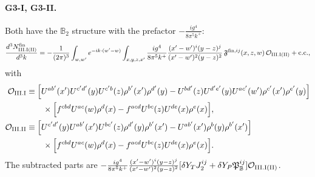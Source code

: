 \documentclass[aps,prd,onecolumn,superscriptaddress,nofootinbib,floatfix,longbibliography,11pt]{revtex4-2}
\numberwithin{equation}{section}
\def\mf#1{\mathbb{#1}}
\newcommand{\pre}{\frac{1}{(2\pi)^3}\int_{w,w'}e^{-ik\cdot(w'-w)}}
\newcommand{\Ord}{\mathcal{O}}
\begin{document}
\paragraph*{G3-I, G3-II.} Both have the $\mf B_2$ structure with the prefactor $-\frac{ig^4}{8\pi^5k^+}$:
\begin{equation}
\frac{d^3N^{\rm fin}_{\rm III.I(II)}}{d^3k}=-\pre\int_{x,y,z,x'}\frac{ig^4}{8\pi^5k^+}\frac{(x'-w')^i(y-z)^j}{(x'-w')^2(y-z)^2}\,\mathfrak F^{{\rm fin},ij}(x,z,w)\,\Ord_{\rm III.I(II)}+{\rm c.c.},
\end{equation}
with
\begin{align}
\Ord_{\rm III.I}&\equiv\Big[U^{ab'}(x')U^{c'd'}(y)U^{c'b}(z)\rho^{b'}(x')\rho^{d'}(y)-U^{bd'}(z)U^{d'e'}(y)U^{ac'}(w')\rho^{c'}(x')\rho^{e'}(y)\Big]\notag\\
&\qquad\times\Big[f^{cbd}U^{ac}(w)\rho^d(x)-f^{acd}U^{bc}(z)U^{de}(x)\rho^e(x)\Big],\notag\\
\Ord_{\rm III.II}&\equiv\Big[U^{c'd'}(y)U^{ab'}(x')U^{bc'}(z)\rho^{d'}(y)\rho^{b'}(x')-U^{ab'}(x')\rho^b(y)\rho^{b'}(x')\Big]\notag\\
&\qquad\times\Big[f^{cbd}U^{ac}(w)\rho^d(x)-f^{acd}U^{bc}(z)U^{de}(x)\rho^e(x)\Big].
\end{align}
The subtracted parts are $-\frac{ig^4}{8\pi^5k^+}\frac{(x'-w')^i(y-z)^j}{(x'-w')^2(y-z)^2}[\delta Y_TJ_2^{ij}+\delta Y_P\mathfrak P_{\mf B}^{ij}]\Ord_{\rm III.I(II)}$.
\end{document}
